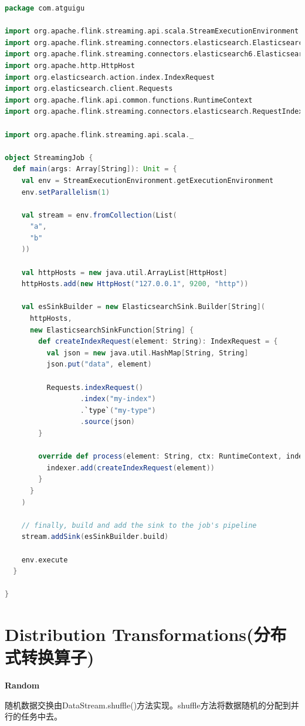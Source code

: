 \documentclass[oneside]{ctexbook}
\begin{document}
\begin{lstlisting}[language=scala]
package com.atguigu

import org.apache.flink.streaming.api.scala.StreamExecutionEnvironment
import org.apache.flink.streaming.connectors.elasticsearch.ElasticsearchSinkFunction
import org.apache.flink.streaming.connectors.elasticsearch6.ElasticsearchSink
import org.apache.http.HttpHost
import org.elasticsearch.action.index.IndexRequest
import org.elasticsearch.client.Requests
import org.apache.flink.api.common.functions.RuntimeContext
import org.apache.flink.streaming.connectors.elasticsearch.RequestIndexer

import org.apache.flink.streaming.api.scala._

object StreamingJob {
  def main(args: Array[String]): Unit = {
    val env = StreamExecutionEnvironment.getExecutionEnvironment
    env.setParallelism(1)

    val stream = env.fromCollection(List(
      "a",
      "b"
    ))

    val httpHosts = new java.util.ArrayList[HttpHost]
    httpHosts.add(new HttpHost("127.0.0.1", 9200, "http"))

    val esSinkBuilder = new ElasticsearchSink.Builder[String](
      httpHosts,
      new ElasticsearchSinkFunction[String] {
        def createIndexRequest(element: String): IndexRequest = {
          val json = new java.util.HashMap[String, String]
          json.put("data", element)

          Requests.indexRequest()
                  .index("my-index")
                  .`type`("my-type")
                  .source(json)
        }

        override def process(element: String, ctx: RuntimeContext, indexer: RequestIndexer): Unit = {
          indexer.add(createIndexRequest(element))
        }
      }
    )

    // finally, build and add the sink to the job's pipeline
    stream.addSink(esSinkBuilder.build)

    env.execute
  }

}
\end{lstlisting}

\section{Distribution Transformations(分布式转换算子)}

\textbf{Random}

随机数据交换由DataStream.shuffle()方法实现。shuffle方法将数据随机的分配到并行的任务中去。
\end{document}
